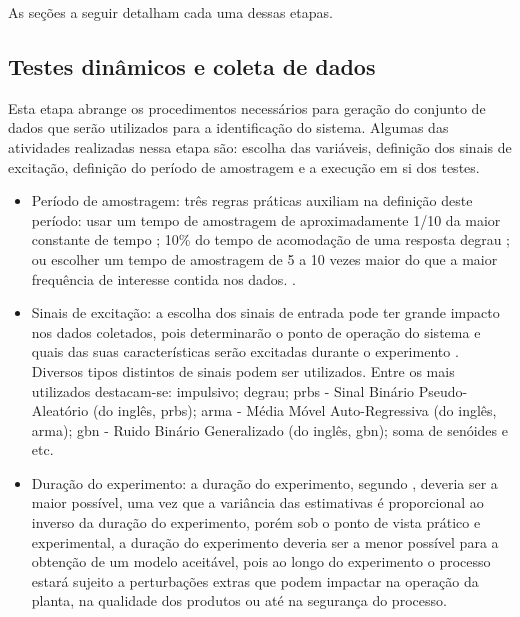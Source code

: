 As seções a seguir detalham cada uma dessas etapas.

\subsection{Testes dinâmicos e coleta de dados}
\label{subsec:testes_dinamicos_e_coleta_de_dados}

Esta etapa abrange os procedimentos necessários para geração do conjunto de dados que serão utilizados
para a identificação do sistema. Algumas das atividades realizadas nessa etapa são: escolha das variáveis,
definição dos sinais de excitação, definição do período de amostragem e a execução em si dos testes.
\cite{Aguirre2015}

\begin{itemize}
    \item Período de amostragem: três regras práticas auxiliam na definição deste período: usar um tempo
        de amostragem de aproximadamente 1/10 da maior constante de tempo ;
        10\% do tempo de acomodação de uma resposta degrau \cite{Ballin2008}; ou escolher um tempo de amostragem
        de 5 a 10 vezes maior do que a maior frequência de interesse contida nos dados. \cite{Aguirre2015}.
    
    \item Sinais de excitação: a escolha dos sinais de entrada pode ter grande impacto nos dados coletados,
        pois determinarão o ponto de operação do sistema e quais das suas características serão excitadas
        durante o experimento \cite{Aguirre2015}.
        Diversos tipos distintos de sinais podem ser utilizados. Entre os mais utilizados destacam-se:
        impulsivo; degrau; \acrshort{prbs} - Sinal Binário Pseudo-Aleatório (do inglês, \acrlong{prbs});
        \acrshort{arma} - Média Móvel Auto-Regressiva (do inglês, \acrlong{arma});
        \acrshort{gbn} - Ruido Binário Generalizado (do inglês, \acrlong{gbn}); soma de senóides e etc.
        \cite{Aguirre2015}
    
    \item Duração do experimento: a duração do experimento, segundo , deveria ser
        a maior possível, uma vez que a variância das estimativas é proporcional ao inverso da duração do
        experimento, porém sob o ponto de vista prático e experimental, a duração do experimento deveria ser
        a menor possível para a obtenção de um modelo aceitável, pois ao longo do experimento o processo
        estará sujeito a perturbações extras que podem impactar na operação da planta, na qualidade dos
        produtos ou até na segurança do processo.
\end{itemize}

